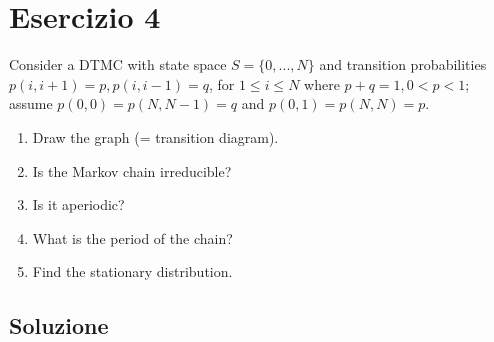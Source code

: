 \documentclass[
	12pt, %
]{fphw}
\begin{document}
\section*{Esercizio 4}

\begin{problem}
	\smallskip
	Consider a DTMC with state space $S = \{0,...,N\}$ and transition probabilities $p(i, i+1) = p, p(i, i-1) = q$, for $1 \leq i \leq N$ where $p+q =1, 0 < p < 1$; assume $p(0, 0) = p(N,N-1)= q$ and $p(0, 1) = p(N,N)= p$.
	\medskip
	\begin{enumerate}
		\item Draw the graph (= transition diagram).
		\item Is the Markov chain irreducible?
		\item Is it aperiodic?
		\item What is the period of the chain?
		\item Find the stationary distribution.
	\end{enumerate}
	\smallskip
\end{problem}


\subsection*{Soluzione}
\end{document}
